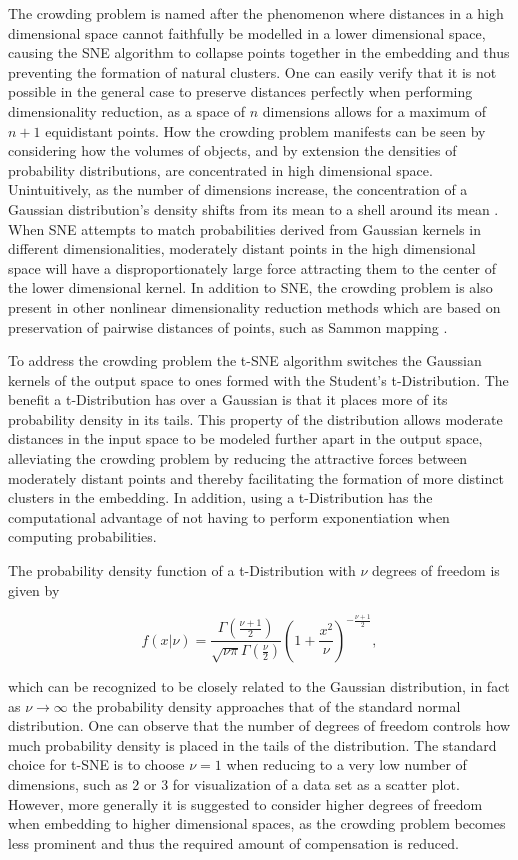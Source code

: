The crowding problem is named after the phenomenon where distances in a high dimensional space cannot faithfully be modelled in a lower dimensional space, causing the SNE algorithm to collapse points together in the embedding and thus preventing the formation of natural clusters. One can easily verify that it is not possible in the general case to preserve distances perfectly when performing dimensionality reduction, as a space of $n$ dimensions allows for a maximum of $n+1$ equidistant points. How the crowding problem manifests can be seen by considering how the volumes of objects, and by extension the densities of probability distributions, are concentrated in high dimensional space. Unintuitively, as the number of dimensions increase, the concentration of a Gaussian distribution's density shifts from its mean to a shell around its mean \cite[p.~50]{high_dimensional_probability}. When SNE attempts to match probabilities derived from Gaussian kernels in different dimensionalities, moderately distant points in the high dimensional space will have a disproportionately large force attracting them to the center of the lower dimensional kernel. In addition to SNE, the crowding problem is also present in other nonlinear dimensionality reduction methods which are based on preservation of pairwise distances of points, such as Sammon mapping \cite{tsne}.

To address the crowding problem the t-SNE algorithm switches the Gaussian kernels of the output space to ones formed with the Student's t-Distribution. The benefit a t-Distribution has over a Gaussian is that it places more of its probability density in its tails. This property of the distribution allows moderate distances in the input space to be modeled further apart in the output space, alleviating the crowding problem by reducing the attractive forces between moderately distant points and thereby facilitating the formation of more distinct clusters in the embedding. In addition, using a t-Distribution has the computational advantage of not having to perform exponentiation when computing probabilities.

The probability density function of a t-Distribution with $\nu$ degrees of freedom is given by

$$f(x \vert \nu) = \frac{\Gamma(\frac{\nu + 1}{2})}{\sqrt{\nu \pi} \Gamma(\frac{\nu}{2})} (1 + \frac{x^2}{\nu})^{-\frac{\nu + 1}{2}},$$

which can be recognized to be closely related to the Gaussian distribution, in fact as $\nu \rightarrow \infty$ the probability density approaches that of the standard normal distribution. One can observe that the number of degrees of freedom controls how much probability density is placed in the tails of the distribution. The standard choice for t-SNE is to choose $\nu = 1$ when reducing to a very low number of dimensions, such as 2 or 3 for visualization of a data set as a scatter plot. However, more generally it is suggested to consider higher degrees of freedom when embedding to higher dimensional spaces, as the crowding problem becomes less prominent and thus the required amount of compensation is reduced.


